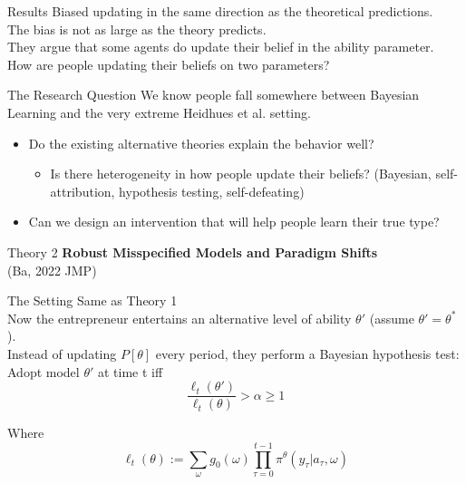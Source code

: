 \documentclass[aspectratio=169]{beamer}
\begin{document}
\begin{frame}{Results}
    Biased updating in the same direction as the theoretical predictions.\\
    \bigskip
    The bias is not as large as the theory predicts.\\
    \bigskip
    They argue that some agents do update their belief in the ability parameter.\\
    \bigskip
    How are people updating their beliefs on two parameters?
\end{frame}

\begin{frame}{The Research Question}
    We know people fall somewhere between Bayesian Learning and the very extreme Heidhues et al. setting.\\
    \bigskip
    \begin{itemize}
        \item Do the existing alternative theories explain the behavior well?\\
        \begin{itemize}
            \item Is there heterogeneity in how people update their beliefs? (Bayesian, self-attribution, hypothesis testing, self-defeating)
        \end{itemize}
    \bigskip
        \item Can we design an intervention that will help people learn their true type?\\
    \end{itemize}
\end{frame}

\begin{frame}{Theory 2}
    \Large\textbf{ Robust Misspecified Models and Paradigm Shifts \\}
    (Ba, 2022 JMP)
\end{frame}


\begin{frame}{The Setting}
    Same as Theory 1\\
    \bigskip
    Now the entrepreneur entertains an alternative level of ability $\theta'$ (assume $\theta' = \theta^*$).\\
    \bigskip
    Instead of updating $P[\theta]$ every period, they perform a Bayesian hypothesis test:\\
    \bigskip
    Adopt model $\theta'$ at time t iff \\
    $$\frac{\ell_t (\theta')}{\ell_t(\theta)}>\alpha\geq1$$

    Where $$\ell_t(\theta) := \sum_{\omega}g_0(\omega)\prod_{\tau=0}^{t-1}\pi^\theta(y_\tau|a_\tau, \omega)$$
  
\end{frame}
\end{document}
